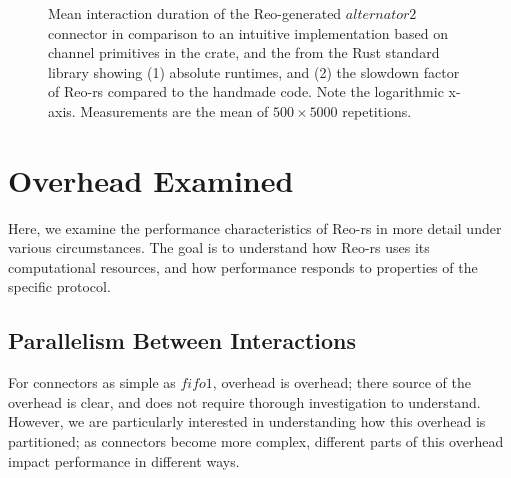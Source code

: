 \begin{figure}
{\begin{subfigure}[b]{0.63\textwidth}
			\caption{}
			\label{fig:alternator2_runtime_1}
		\end{subfigure}%
	}
	\caption[Handcrafted vs.\ Reo-generated alternator.]{Mean interaction duration of the Reo-generated $alternator2$ connector in comparison to an intuitive implementation based on channel primitives in the  crate, and the  from the Rust standard library showing (1) absolute runtimes, and (2) the slowdown factor of Reo-rs compared to the handmade code. Note the logarithmic x-axis. Measurements are the mean of $500\times{}5000$ repetitions.}
	\label{fig:alternator}
	\label{fig:alternator2_runtime}
\end{figure}

\section{Overhead Examined}
\label{sec:overhead_examined}
Here, we examine the performance characteristics of Reo-rs in more detail under various circumstances. The goal is to understand how Reo-rs uses its computational resources, and how performance responds to properties of the specific protocol.

\subsection{Parallelism Between Interactions}

For connectors as simple as $fifo1$, overhead is overhead; there source of the overhead is clear, and does not require thorough investigation to understand. However, we are particularly interested in understanding how this overhead is partitioned; as connectors become more complex, different parts of this overhead impact performance in different ways. 

